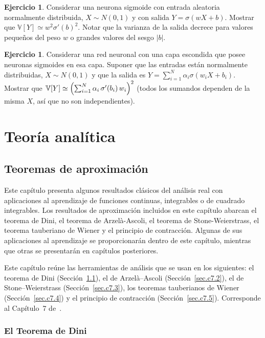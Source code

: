 \documentclass[12pt, a4paper]{amsbook}
\newcommand{\V}{{\mathbb V}}
\theoremstyle{remark}
\theoremstyle{definition}
\newtheorem{ejer}[teo]{Ejercicio}
\numberwithin{section}{chapter}
\numberwithin{subsection}{section}
\numberwithin{equation}{section}
\numberwithin{figure}{chapter}
\begin{document}
\begin{ejer}
Considerar una neurona sigmoide con entrada aleatoria normalmente distribuida, $X\sim N(0,1)$ y con salida $Y=\sigma(wX+ b)$. Mostrar que $\V[Y] \simeq w^2 \sigma'(b)^2$. Notar que la varianza de la salida decrece para valores pequeños del peso $w$ o grandes valores del sesgo $|b|$.
\end{ejer}

\begin{ejer}
Considerar una red neuronal con una capa escondida que posee neuronas sigmoides en esa capa. Suponer que las entradas están normalmente distribuidas, $X\sim N(0,1)$ y que la salida es $Y=\sum_{i=1}^N \alpha_i \sigma(w_i X + b_i)$. Mostrar que $\V[Y]\simeq \Bigl(\sum_{i=1}^N \alpha_i\,\sigma'(b_i)\, w_i\Bigr)^2$ (todos los sumandos dependen de la misma $X$, así que no son independientes).
\end{ejer}

\part{Teoría analítica}


\chapter{Teoremas de aproximación}

Este capítulo presenta algunos resultados clásicos del análisis real con aplicaciones al aprendizaje de funciones continuas, integrables o de cuadrado integrables. Los resultados de aproximación incluidos en este capítulo abarcan el teorema de Dini, el teorema de Arzelà-Ascoli, el teorema de Stone-Weierstrass, el teorema tauberiano de Wiener y el principio de contracción. Algunas de sus aplicaciones al aprendizaje se proporcionarán dentro de este capítulo, mientras que otras se presentarán en capítulos posteriores.

Este capítulo reúne las herramientas de análisis que se usan en los siguientes: el teorema de Dini (Sección~\ref{sec.c7.1}), el de Arzelà--Ascoli (Sección~\ref{sec.c7.2}), el de Stone--Weierstrass (Sección~\ref{sec.c7.3}), los teoremas tauberianos de Wiener (Sección~\ref{sec.c7.4}) y el principio de contracción (Sección~\ref{sec.c7.5}). Corresponde al Capítulo~7 de~\cite{Calin}.

\section{El Teorema de Dini}\label{sec.c7.1}
\end{document}
